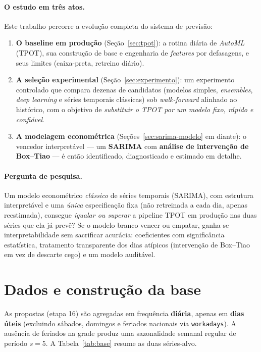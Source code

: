 \documentclass[11pt,a4paper]{article}
\begin{document}
\paragraph{O estudo em três atos.} Este trabalho percorre a evolução completa do sistema de
previsão:
\begin{enumerate}\setlength\itemsep{2pt}
\item \textbf{O baseline em produção} (Seção~\ref{sec:tpot}): a rotina diária de \emph{AutoML}
(TPOT), sua construção de base e engenharia de \emph{features} por defasagens, e seus limites
(caixa-preta, retreino diário).
\item \textbf{A seleção experimental} (Seção~\ref{sec:experimento}): um experimento controlado que
compara dezenas de candidatos (modelos simples, \emph{ensembles}, \emph{deep learning} e séries
temporais clássicas) sob \emph{walk-forward} alinhado ao histórico, com o objetivo de
\emph{substituir o TPOT por um modelo fixo, rápido e confiável}.
\item \textbf{A modelagem econométrica} (Seções~\ref{sec:sarima-modelo} em diante): o vencedor
interpretável --- um \textbf{SARIMA} com \textbf{análise de intervenção de Box--Tiao} --- é então
identificado, diagnosticado e estimado em detalhe.
\end{enumerate}

\paragraph{Pergunta de pesquisa.} Um modelo econométrico \emph{clássico} de séries temporais
(SARIMA), com estrutura interpretável e uma \emph{única} especificação fixa (não retreinada a cada
dia, apenas reestimada), consegue \emph{igualar ou superar} a pipeline TPOT em produção nas duas
séries que ela já prevê? Se o modelo branco vencer ou empatar, ganha-se interpretabilidade sem
sacrificar acurácia: coeficientes com significância estatística, tratamento transparente dos dias
atípicos (intervenção de Box--Tiao em vez de descarte cego) e um modelo auditável.

\section{Dados e construção da base}
\label{sec:dados}

As propostas (etapa 16) são agregadas em frequência \textbf{diária}, apenas em \textbf{dias úteis}
(excluindo sábados, domingos e feriados nacionais via \texttt{workadays}). A ausência de feriados
na grade produz uma sazonalidade semanal regular de período $s = 5$. A Tabela~\ref{tab:base}
resume as duas séries-alvo.
\end{document}
